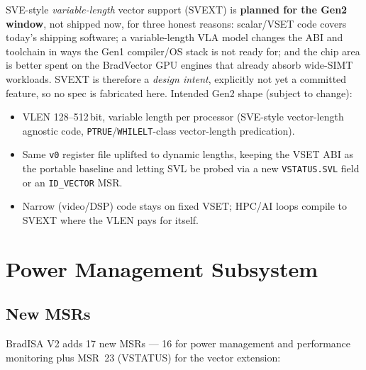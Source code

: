 \documentclass[11pt,a4paper]{article}
\begin{document}
SVE-style \emph{variable-length} vector support (SVEXT) is \textbf{planned
for the Gen2 window}, not shipped now, for three honest reasons:
scalar/VSET code covers today's shipping software; a variable-length VLA
model changes the ABI and toolchain in ways the Gen1 compiler/OS stack is
not ready for; and the chip area is better spent on the BradVector GPU
engines that already absorb wide-SIMT workloads. SVEXT is therefore a
\emph{design intent}, explicitly not yet a committed feature, so no spec
is fabricated here. Intended Gen2 shape (subject to change):

\begin{itemize}[nosep]
  \item VLEN 128--512\,bit, variable length per processor (SVE-style
        vector-length agnostic code, {\tt PTRUE}/\texttt{WHILELT}-class
        vector-length predication).
  \item Same {\tt v0} register file uplifted to dynamic lengths, keeping
        the VSET ABI as the portable baseline and letting SVL be probed
        via a new {\tt VSTATUS.SVL} field or an {\tt ID\_VECTOR} MSR.
  \item Narrow (video/DSP) code stays on fixed VSET; HPC/AI loops compile
        to SVEXT where the VLEN pays for itself.
\end{itemize}

\newpage

\section{Power Management Subsystem}

\subsection{New MSRs}

BradISA V2 adds 17 new MSRs --- 16 for power management and performance
monitoring plus MSR~23 (VSTATUS) for the vector extension:
\end{document}
